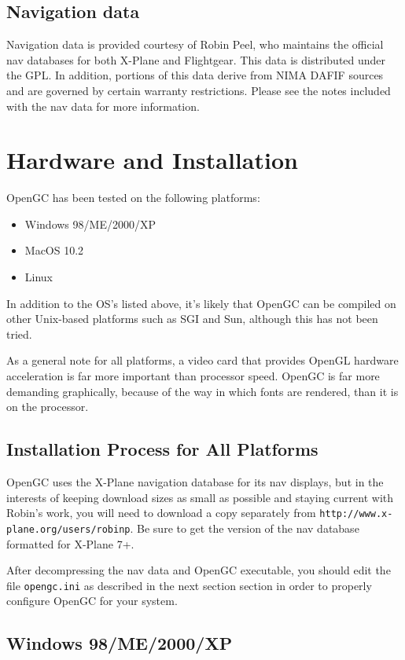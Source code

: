 \documentclass[11pt]{article}
\begin{document}
\subsection{Navigation data}
Navigation data is provided courtesy of Robin Peel, who maintains the official nav databases for both X-Plane and Flightgear. This data is distributed under the GPL. In addition, portions of this data derive from NIMA DAFIF sources and are governed by certain warranty restrictions. Please see the notes included with the nav data for more information.

\section{Hardware and Installation}

OpenGC has been tested on the following platforms:
\begin{itemize}
\item Windows 98/ME/2000/XP
\item MacOS 10.2
\item Linux
\end{itemize}
\noindent In addition to the OS's listed above, it's likely that OpenGC can be compiled on other Unix-based platforms such as SGI and Sun, although this has not been tried.

As a general note for all platforms, a video card that provides OpenGL hardware acceleration is far more important than processor speed. OpenGC is far more demanding graphically, because of the way in which fonts are rendered, than it is on the processor.

\subsection{Installation Process for All Platforms}

OpenGC uses the X-Plane navigation database for its nav displays, but in the interests of keeping download sizes as small as possible and staying current with Robin's work, you will need to download a copy separately from \texttt{http://www.x-plane.org/users/robinp}. Be sure to get the version of the nav database formatted for X-Plane 7+.

After decompressing the nav data and OpenGC executable, you should edit the file \texttt{opengc.ini} as described in the next section section in order to properly configure OpenGC for your system.

\subsection{Windows 98/ME/2000/XP}
\end{document}
